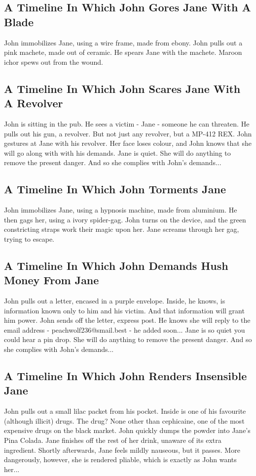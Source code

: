 \documentclass{article}
\begin{document}
\subsection{A Timeline In Which John Gores Jane With A Blade}


John immobilizes Jane, using a wire frame, made from ebony.
John pulls out a pink machete, made out of ceramic.
He spears Jane with the machete.
Maroon ichor spews out from the wound.
\subsection{A Timeline In Which John Scares Jane With A Revolver}


John is sitting in the pub.
He sees a victim {-} Jane {-} someone he can threaten. He pulls out his gun, a revolver.
But not just any revolver, but a MP{-}412 REX.
John gestures at Jane with his revolver. Her face loses colour, and John knows that she will go along with with his demands.
Jane is quiet. She will do anything to remove the present danger. And so she complies with John's demands...
\subsection{A Timeline In Which John Torments Jane}


John immobilizes Jane, using a hypnosis machine, made from aluminium.
He then gags her, using a ivory spider{-}gag.
John turns on the device, and the green constricting straps work their magic upon her.
Jane screams through her gag, trying to escape.
\subsection{A Timeline In Which John Demands Hush Money From Jane}


John pulls out a letter, encased in a purple envelope. Inside, he knows, is information known only to him and his victim. And that information will grant him power.
John sends off the letter, express post. He knows she will reply to the email address {-} peachwolf236@smail.best {-} he added soon...
Jane is so quiet you could hear a pin drop. She will do anything to remove the present danger. And so she complies with John's demands...
\subsection{A Timeline In Which John Renders Insensible Jane}


John pulls out a small lilac packet from his pocket. Inside is one of his favourite (although illicit) drugs.
The drug? None other than cephicaine, one of the most expensive drugs on the black market.
John quickly dumps the powder into Jane's Pina Colada.
Jane finishes off the rest of her drink, unaware of its extra ingredient.
Shortly afterwards, Jane feels mildly nauseous, but it passes.
More dangerously, however, she is rendered pliable, which is exactly as John wants her...
\end{document}
